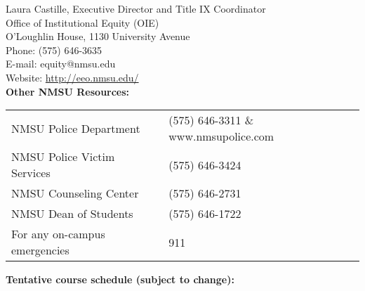 \documentclass{article}
\begin{document}
\noindent Laura Castille, Executive Director and Title IX Coordinator \\
Office of Institutional Equity (OIE) \\
O'Loughlin House, 1130 University Avenue \\
Phone: (575) 646-3635 \\
E-mail: equity@nmsu.edu \\
Website: \url{http://eeo.nmsu.edu/} \\

\noindent\textbf{Other NMSU Resources:}

\begin{tabular}{p{7cm}p{8cm}}
NMSU Police Department & (575) 646-3311 \& www.nmsupolice.com \\
NMSU Police Victim Services & (575) 646-3424 \\
NMSU Counseling Center & (575) 646-2731 \\
NMSU Dean of Students & (575) 646-1722 \\
For any on-campus emergencies & 911
\end{tabular}
\newpage
\noindent\textbf{Tentative course schedule (subject to change):}
\end{document}
